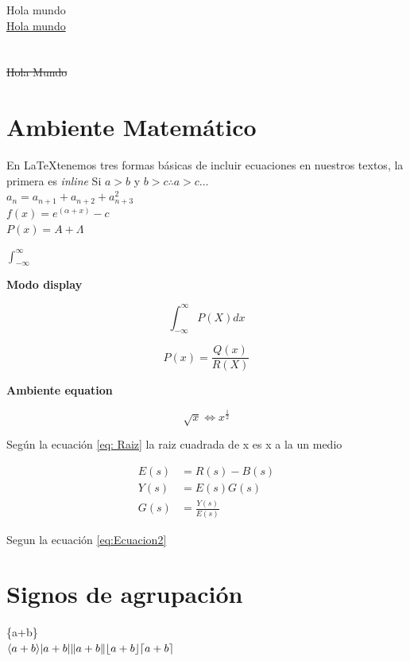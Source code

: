 \documentclass{article}
\begin{document}
	
	\renewcommand{\figurename}{Imagen}
	\renewcommand{\listfigurename}{Figuras}
	
	\listoffigures
	\newpage
	\textcolor{MiColor}{Hola mundo}\\
	\uline{Hola mundo}\\
	\\
	\\
	\st{Hola Mundo}
	
	\section{Ambiente Matemático}
	
	
	En \LaTeX  tenemos tres formas básicas de incluir ecuaciones en nuestros textos, la primera es \textit{inline} Si $ a> b $ y $ b>c \therefore a>c \ldots$\\
	
	$ a_n=a_{n+1} + a_{n+2} + a_{n+3}^2 $\\
	$ f(x)=e^{(\alpha+x)}-c $\\
	$ P(x)=A + \Lambda $
	
	$ \int_{-\infty}^{\infty} $

\textbf{Modo display}

\[
	\int_{-\infty}^{\infty}P(X) dx
\]

\[
	P(x)=\frac{Q(x)}{R(X)}
\]

\textbf{Ambiente equation}

\begin{equation}	
	\sqrt{x} \Leftrightarrow x^{\frac{1}{2}}
	\label{eq: Raiz}		
\end{equation}

Según la ecuación \ref{eq: Raiz} la raiz cuadrada de x es x a la un medio

\begin{align}
	E(s)&=R(s)-B(s)\\
	Y(s)&=E(s)G(s)\\
	G(s)&=\frac{Y(s)}{E(s)}\label{eq:Ecuacion2}
\end{align}

Segun la ecuación \ref{eq:Ecuacion2}

\section{Signos de agrupación}

\{a+b\}\\
$ \langle a+b \rangle \\
\lvert a+b \rvert\\
\lVert a+b \rVert\\
\lfloor a+b \rfloor\\
\lceil a+b \rceil$
\end{document}
